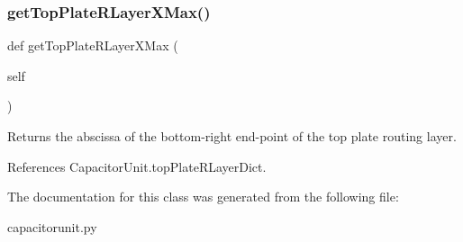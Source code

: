 \subsubsection{\texorpdfstring{get\+Top\+Plate\+R\+Layer\+X\+Max()}{getTopPlateRLayerXMax()}}
{\footnotesize\ttfamily def get\+Top\+Plate\+R\+Layer\+X\+Max (\begin{DoxyParamCaption}\item[{}]{self }\end{DoxyParamCaption})}

\begin{DoxyReturn}{Returns}
the abscissa of the bottom-\/right end-\/point of the top plate routing layer. 
\end{DoxyReturn}


References Capacitor\+Unit.\+top\+Plate\+R\+Layer\+Dict.



The documentation for this class was generated from the following file\+:\begin{DoxyCompactItemize}
\item 
capacitorunit.\+py\end{DoxyCompactItemize}
